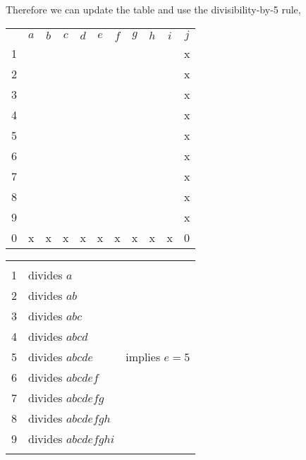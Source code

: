 Therefore we can update the table and use the divisibility-by-5 rule,
\begin{center}
\begin{tabular}{ccccccccccc}
			&	$a$	&	$b$	&	$c$	&	$d$	&	$e$	&	$f$	&	$g$	&	$h$	&	$i$	&	$j$	\\
	1		&		&		&		&		&		&		&		&		&		&	x	\\
	2		&		&		&		&		&		&		&		&		&		&	x	\\
	3		&		&		&		&		&		&		&		&		&		&	x	\\
	4		&		&		&		&		&		&		&		&		&		&	x	\\
	5		&		&		&		&		&		&		&		&		&		&	x	\\
	6		&		&		&		&		&		&		&		&		&		&	x	\\
	7		&		&		&		&		&		&		&		&		&		&	x	\\
	8		&		&		&		&		&		&		&		&		&		&	x	\\
	9		&		&		&		&		&		&		&		&		&		&	x	\\
	0		&	x	&	x	&	x	&	x	&	x	&	x	&	x	&	x	&	x	&	0	\\
\end{tabular}
\hspace{1cm}\vline\hspace{1cm}
\begin{tabular}{rll}
	& \\
	1	&	divides $a$						\\
	2	&	divides $ab$					\\
	3	&	divides $abc$					\\
	4	&	divides $abcd$					\\
	5	&	divides $abcde$				& implies $e=5$	\\
	6	&	divides $abcdef$				\\
	7	&	divides $abcdefg$				\\
	8	&	divides $abcdefgh$				\\
	9	&	divides $abcdefghi$				\\
		&	
\end{tabular}
\end{center}


